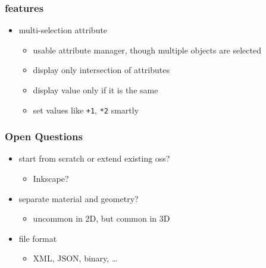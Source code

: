 \documentclass{beamer}
\begin{document}
\begin{frame}[t]\frametitle{features}
\begin{itemize}
  \item multi-selection attribute
  \begin{itemize}
    \item usable attribute manager, though multiple objects are selected
    \item display only intersection of attributes
    \item display value only if it is the same
    \item set values like \texttt{+1}, \texttt{*2} smartly
  \end{itemize}
\end{itemize}
\end{frame}

\begin{frame}[t]\frametitle{Open Questions}
\begin{itemize}
  \item start from scratch or extend existing oss?
  \begin{itemize}
    \item Inkscape?
  \end{itemize}
  \item separate material and geometry?
  \begin{itemize}
    \item uncommon in 2D, but common in 3D
  \end{itemize}
  \item file format
  \begin{itemize}
    \item XML, JSON, binary, \dots
  \end{itemize}
\end{itemize}


\end{frame}
\end{document}
